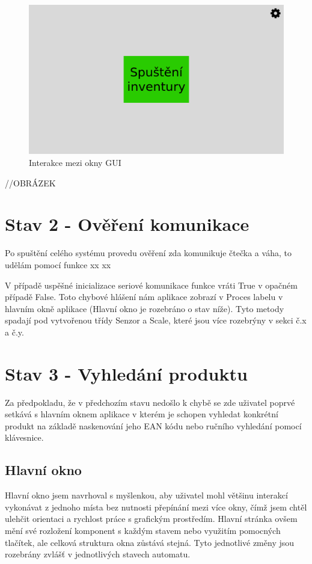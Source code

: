 \begin{figure}[!h]
    \begin{center}
        \includegraphics[scale=0.4]{obrazky/GUI Spuštění inventury.png}
    \end{center}
    \caption{Interakce mezi okny GUI}
    \label{Interakce mezi okny GUI}
\end{figure}

//OBRÁZEK

\section{Stav 2 - Ověření komunikace}
Po spuštění celého systému provedu ověření zda komunikuje čtečka a váha, to udělám pomocí funkce 
xx 
xx 

V případě uspěšné inicializace seriové komunikace funkce vráti True v opačném případě False. Toto chybové hlášení nám aplikace zobrazí v Proces labelu v hlavním okně aplikace (Hlavní okno je rozebráno o stav níže). Tyto metody spadají pod vytvořenou třídy Senzor a Scale, které jsou více rozebrýny v sekci č.x a č.y. 

\section{Stav 3 - Vyhledání produktu}

Za předpokladu, že v předchozím stavu nedošlo k chybě se zde uživatel poprvé setkává s hlavním oknem aplikace v kterém je schopen vyhledat konkrétní produkt na základě naskenování jeho EAN kódu nebo ručního vyhledání pomocí klávesnice.

\subsection{Hlavní okno}
Hlavní okno jsem navrhoval s myšlenkou, aby uživatel mohl většinu interakcí vykonávat z jednoho místa bez nutnosti přepínání mezi více okny, čímž jsem chtěl ulehčit orientaci a rychlost práce s grafickým prostředím. Hlavní stránka ovšem mění své rozložení komponent s každým stavem nebo využitím pomocných tlačítek, ale celková struktura okna zůstává stejná. Tyto jednotlivé změny jsou rozebrány zvlášť v jednotlivých stavech automatu.

